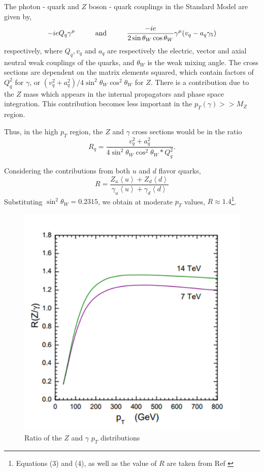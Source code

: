 \documentclass[11pt,a4paper,final]{report}
\begin{document}
The photon - quark and $Z$ boson - quark couplings in the Standard Model are given by,
\begin{equation}
	-ieQ_q\gamma^{\mu} \hspace{1 cm} \text{and} \hspace{1 cm}\frac{-ie}{2 \sin\theta_W \cos\theta_W}\gamma^{\mu}(v_q - a_q\gamma_5)
\end{equation}
respectively, where $Q_q,v_q$ and $a_q$ are respectively the electric, vector and axial neutral weak couplings of the quarks, and $\theta_W$ is the weak mixing angle. The cross sections are dependent on the matrix elements squared, which contain factors of $Q_q^2$ for $\gamma$, or $(v_q^2 + a_q^2)/4\sin^2 \theta_W \cos^2 \theta_W$ for $Z$. There is a contribution due to the $Z$ mass which appears in the internal propagators and phase space integration. This contribution becomes less important in the $p_T(\gamma) >> M_Z$ region.

Thus, in the high $p_T$ region, the $Z$ and $\gamma$ cross sections would be in the ratio
\begin{equation}
	R_q = \frac{v_q^2 + a_q^2}{4\sin^2 \theta_W \cos^2 \theta_W * Q_q^2}.
\end{equation} 

Considering the contributions from both $u$ and $d$ flavor quarks,
\begin{equation}
	R = \frac{Z_u \left\langle u \right\rangle + Z_d \left\langle d\right\rangle}{\gamma_u \left\langle u\right\rangle + \gamma_d \left\langle d\right\rangle}
\end{equation}
Substituting $\sin^2 \theta_W = 0.2315$, we obtain at moderate $p_T$ values, $R \approx 1.4$\footnote{Equations (3) and (4), as well as the value of $R$ are taken from Ref \cite{gammajet}}.

\begin{figure}[H]
	\centering
		\includegraphics[scale=0.5]{paper_Rplot.png}
		\caption{Ratio of the $Z$ and $\gamma$ $p_T$ distributions \cite{gammajet}}
\end{figure}
\end{document}

